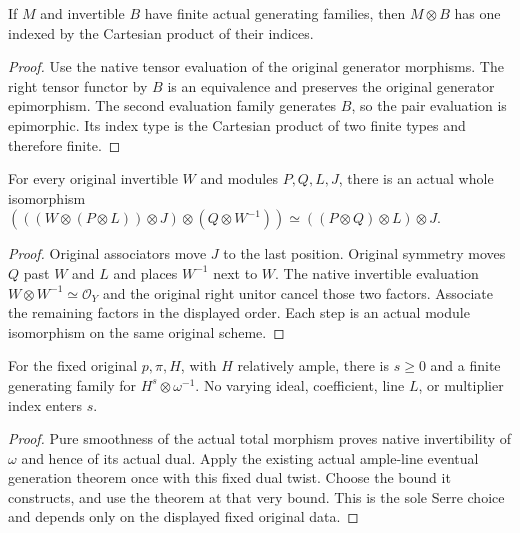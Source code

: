 \begin{lemma}
\label{lem:c0n-uniform-finite-tensor-generators}
\leanok
If $M$ and invertible $B$ have finite actual generating families, then
$M\otimes B$ has one indexed by the Cartesian product of their indices.
\end{lemma}
\begin{proof}
Use the native tensor evaluation of the original generator morphisms.
The right tensor functor by $B$ is an equivalence and preserves the
original generator epimorphism.  The second evaluation family generates
$B$, so the pair evaluation is epimorphic.  Its index type is the
Cartesian product of two finite types and therefore finite.
\end{proof}

\begin{lemma}
\label{lem:c0n-uniform-canonical-cancellation-iso}
\leanok
For every original invertible $W$ and modules $P,Q,L,J$, there is an
actual whole isomorphism
$(((W\otimes(P\otimes L))\otimes J)\otimes(Q\otimes W^{-1}))
\simeq((P\otimes Q)\otimes L)\otimes J$.
\end{lemma}
\begin{proof}
Original associators move $J$ to the last position.  Original symmetry
moves $Q$ past $W$ and $L$ and places $W^{-1}$ next to $W$.
The native invertible evaluation $W\otimes W^{-1}\simeq\mathcal O_Y$
and the original right unitor cancel those two factors.  Associate the
remaining factors in the displayed order.  Each step is an actual module
isomorphism on the same original scheme.
\end{proof}

\begin{lemma}
\label{lem:c0n-uniform-inverse-canonical-buffer}
\leanok
For the fixed original $p,\pi,H$, with $H$ relatively ample, there is
$s\geq0$ and a finite generating family for $H^s\otimes\omega^{-1}$.
No varying ideal, coefficient, line $L$, or multiplier index enters $s$.
\end{lemma}
\begin{proof}
Pure smoothness of the actual total morphism proves native invertibility
of $\omega$ and hence of its actual dual.  Apply the existing actual
ample-line eventual generation theorem once with this fixed dual twist.
Choose the bound it constructs, and use the theorem at that very bound.
This is the sole Serre choice and depends only on the displayed fixed
original data.
\end{proof}

